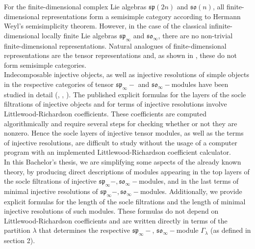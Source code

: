 \documentclass[main.tex]{subfiles}
\begin{document}
For the finite-dimensional complex Lie algebras $\mathfrak{sp}(2n)$ and $\mathfrak{so}(n)$, all finite-dimensional representations form a semisimple category according to Hermann Weyl's semisimplicity theorem. However, in the case of the classical infinite-dimensional locally finite Lie algebras  $\mathfrak{sp}_\infty$ and $\mathfrak{so}_\infty$, there are no non-trivial finite-dimensional representations. Natural analogues of finite-dimensional representations are the tensor representations and, as shown in \cite{penkov2007tensorrepresentationsclassicallocally}, these do not form semisimple categories.\\ 

Indecomposable injective objects, as well as injective resolutions of simple objects in the respective categories of tensor $\mathfrak{sp}_\infty- $ and $ \mathfrak{so}_\infty-$modules have been studied in detail (\cite{penkov2007tensorrepresentationsclassicallocally}, \cite{dancohen2012koszulcategoryrepresentationsfinitary}, \cite{SAM_2015}). The published explicit formulas for the layers of the socle filtrations of injective objects and for terms of injective resolutions involve Littlewood-Richardson coefficients. These coefficients are computed algorithmically and require several steps for checking whether or not they are nonzero.
Hence the socle layers of injective tensor modules, as well as the terms of injective resolutions, are difficult to study without the usage of a computer program with an implemented Littlewood-Richardson coefficient calculator.\\

In this Bachelor's thesis, we are simplifying some aspects of the already known theory, by producing direct descriptions of modules appearing in the top layers of the socle filtrations of injective $\mathfrak{sp}_\infty-,\mathfrak{so}_\infty-$modules, and in the last terms of minimal injective resolutions of $\mathfrak{sp}_\infty-,\mathfrak{so}_\infty-$modules. Additionally, we provide explicit formulas for the length of the socle filtrations and the length of minimal injective resolutions of such modules. These formulas do not depend on Littlewood-Richardson coefficients and are written directly in terms of the partition $\lambda$ that determines the respective $\mathfrak{sp}_\infty-$, $\mathfrak{so}_\infty-$module $\Gamma_\lambda$ (as defined in section 2).  \\
\end{document}
